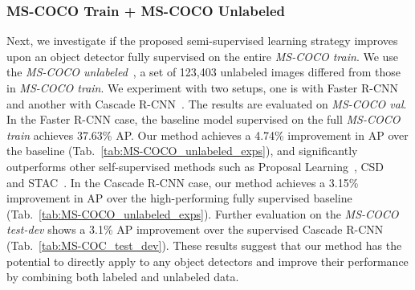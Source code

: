 \documentclass[final]{cvpr}
\begin{document}
\begin{table}

  \label{tab:MS-COCO_unlabeled_exps_2}
  \centering
  \caption{The mAP (50:95) results on \textbf{\textit{MS-COCO test-dev 2017}} by models trained on \textit{MS-COCO train 2017} + \textit{MS-COCO unlabeled}.}
  \label{tab:MS-COC_test_dev}
\end{table}

\subsubsection{MS-COCO Train + MS-COCO Unlabeled} 
\label{sec:coco_full}

Next, we investigate if the proposed semi-supervised learning strategy improves upon an object detector fully supervised on the entire \textit{MS-COCO train}. We use the \textit{MS-COCO unlabeled}~\cite{lin2014microsoft}, a set of 123,403 unlabeled images differed from those in \textit{MS-COCO train}. We experiment with two setups, one is with Faster R-CNN~\cite{ren2015faster} and another with Cascade R-CNN~\cite{cai2018cascade}. The results are evaluated on \textit{MS-COCO val}. In the Faster R-CNN case, the baseline model supervised on the full \textit{MS-COCO train} achieves 37.63\% AP. Our method achieves a 4.74\% improvement in AP over the baseline (Tab.~\ref{tab:MS-COCO_unlabeled_exps}), and significantly outperforms other self-supervised methods such as Proposal Learning~\cite{tang2021proposal}, CSD~\cite{jeong2019consistency} and STAC~\cite{sohn2020simple}. In the Cascade R-CNN case, our method achieves a 3.15\% improvement in AP over the high-performing fully supervised baseline (Tab.~\ref{tab:MS-COCO_unlabeled_exps}). 
Further evaluation on the \textit{MS-COCO test-dev} shows a 3.1\% AP improvement over the supervised Cascade R-CNN (Tab.~\ref{tab:MS-COC_test_dev}).
These results suggest that our method has the potential to directly apply to any object detectors and improve their performance by combining both labeled and unlabeled data. 
\end{document}
